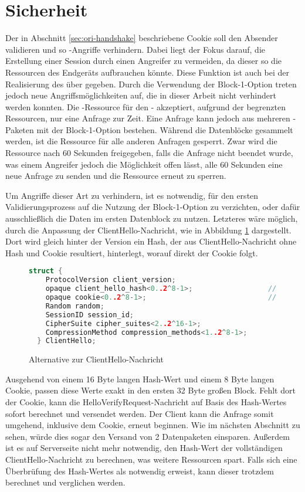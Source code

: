 \section{Sicherheit}

Der in Abschnitt \ref{sec:ori-handshake} beschriebene Cookie soll den Absender validieren und so -Angriffe verhindern.
Dabei liegt der Fokus darauf, die Erstellung einer Session durch einen Angreifer zu vermeiden, da dieser so die Ressourcen des Endgeräts aufbrauchen könnte.
Diese Funktion ist auch bei der Realisierung des  über  gegeben. Durch die Verwendung der Block-1-Option treten jedoch neue
Angriffsmöglichkeiten auf, die in dieser Arbeit nicht verhindert werden konnten. Die -Ressource für den - akzeptiert, aufgrund
der begrenzten Ressourcen, nur eine Anfrage zur Zeit. Eine Anfrage kann jedoch aus mehreren -Paketen mit der Block-1-Option bestehen. Während
die Datenblöcke gesammelt werden, ist die Ressource für alle anderen Anfragen gesperrt. Zwar wird die Ressource nach 60 Sekunden freigegeben, falls die Anfrage
nicht beendet wurde, was einem Angreifer jedoch die Möglichkeit offen lässt, alle 60 Sekunden eine neue Anfrage zu senden und die Ressource erneut zu sperren.

Um Angriffe dieser Art zu verhindern, ist es notwendig, für den ersten Validierungsprozess auf die Nutzung der Block-1-Option zu verzichten, oder dafür ausschließlich
die Daten im ersten Datenblock zu nutzen. Letzteres wäre möglich, durch die Anpassung der ClientHello-Nachricht, wie in Abbildung \ref{fig:clienthelloalternative} dargestellt.
Dort wird gleich hinter der Version ein Hash, der aus ClientHello-Nachricht ohne Hash und Cookie resultiert, hinterlegt, worauf direkt der Cookie folgt.

\begin{figure}[ht]
  \centering
  \begin{lstlisting}[language=c]
  struct {
    ProtocolVersion client_version;
    opaque client_hello_hash<0..2^8-1>;                  // New field
    opaque cookie<0..2^8-1>;                             // New field
    Random random;
    SessionID session_id;
    CipherSuite cipher_suites<2..2^16-1>;
    CompressionMethod compression_methods<1..2^8-1>;
  } ClientHello;
  \end{lstlisting}
  \caption{Alternative zur ClientHello-Nachricht}
  \label{fig:clienthelloalternative}
\end{figure}

Ausgehend von einem 16 Byte langen Hash-Wert und einem 8 Byte langen Cookie, passen diese Werte exakt in den ersten 32 Byte großen Block. Fehlt dort der Cookie,
kann die HelloVerifyRequest-Nachricht auf Basis des Hash-Wertes sofort berechnet und versendet werden. Der Client kann die Anfrage somit umgehend, inklusive dem
Cookie, erneut beginnen. Wie im nächsten Abschnitt zu sehen, würde dies sogar den Versand von 2 Datenpaketen einsparen. Außerdem ist es auf Serverseite
nicht mehr notwendig, den Hash-Wert der vollständigen ClientHello-Nachricht zu berechnen, was weitere Ressourcen spart. Falls sich eine Überbrüfung des Hash-Wertes
als notwendig erweist, kann dieser trotzdem berechnet und verglichen werden.